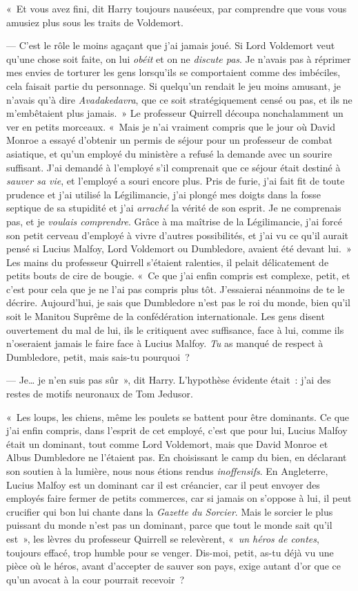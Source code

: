 «~Et vous avez fini, dit Harry toujours nauséeux, par comprendre que vous vous amusiez plus sous les traits de Voldemort.

--- C'est le rôle le moins agaçant que j'ai jamais joué. Si Lord Voldemort veut qu'une chose soit faite, on lui \emph{obéit} et on ne \emph{discute pas}. Je n'avais pas à réprimer mes envies de torturer les gens lorsqu'ils se comportaient comme des imbéciles, cela faisait partie du personnage. Si quelqu'un rendait le jeu moins amusant, je n'avais qu'à dire \emph{Avadakedavra}, que ce soit stratégiquement censé ou pas, et ils ne m'embêtaient plus jamais.~» Le professeur Quirrell découpa nonchalamment un ver en petits morceaux. «~Mais je n'ai vraiment compris que le jour où David Monroe a essayé d'obtenir un permis de séjour pour un professeur de combat asiatique, et qu'un employé du ministère a refusé la demande avec un sourire suffisant. J'ai demandé à l'employé s'il comprenait que ce séjour était destiné à \emph{sauver sa vie}, et l'employé a souri encore plus. Pris de furie, j'ai fait fit de toute prudence et j'ai utilisé la Légilimancie, j'ai plongé mes doigts dans la fosse septique de sa stupidité et j'ai \emph{arraché} la vérité de son esprit. Je ne comprenais pas, et je \emph{voulais comprendre}. Grâce à ma maîtrise de la Légilimancie, j'ai forcé son petit cerveau d'employé à vivre d'autres possibilités, et j'ai vu ce qu'il aurait pensé si Lucius Malfoy, Lord Voldemort ou Dumbledore, avaient été devant lui.~» Les mains du professeur Quirrell s'étaient ralenties, il pelait délicatement de petits bouts de cire de bougie. «~Ce que j'ai enfin compris est complexe, petit, et c'est pour cela que je ne l'ai pas compris plus tôt. J'essaierai néanmoins de te le décrire. Aujourd'hui, je sais que Dumbledore n'est pas le roi du monde, bien qu'il soit le Manitou Suprême de la confédération internationale. Les gens disent ouvertement du mal de lui, ils le critiquent avec suffisance, face à lui, comme ils n'oseraient jamais le faire face à Lucius Malfoy. \emph{Tu} as manqué de respect à Dumbledore, petit, mais sais-tu pourquoi~?

--- Je… je n'en suis pas sûr~», dit Harry. L'hypothèse évidente était~: j'ai des restes de motifs neuronaux de Tom Jedusor.

«~Les loups, les chiens, même les poulets se battent pour être dominants. Ce que j'ai enfin compris, dans l'esprit de cet employé, c'est que pour lui, Lucius Malfoy était un dominant, tout comme Lord Voldemort, mais que David Monroe et Albus Dumbledore ne l'étaient pas. En choisissant le camp du bien, en déclarant son soutien à la lumière, nous nous étions rendus \emph{inoffensifs}. En Angleterre, Lucius Malfoy est un dominant car il est créancier, car il peut envoyer des employés faire fermer de petits commerces, car si jamais on s'oppose à lui, il peut crucifier qui bon lui chante dans la \emph{Gazette du Sorcier}. Mais le sorcier le plus puissant du monde n'est pas un dominant, parce que tout le monde sait qu'il est~», les lèvres du professeur Quirrell se relevèrent, «~\emph{un héros de contes}, toujours effacé, trop humble pour se venger. Dis-moi, petit, as-tu déjà vu une pièce où le héros, avant d'accepter de sauver son pays, exige autant d'or que ce qu'un avocat à la cour pourrait recevoir~?

